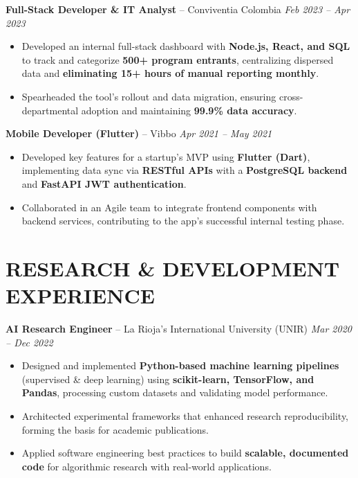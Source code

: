 \documentclass[11pt, a4paper]{article}
\begin{document}
\textbf{Full-Stack Developer \& IT Analyst} – Conviventia Colombia \hfill \textit{Feb 2023 – Apr 2023}
\begin{itemize}[leftmargin=*, nosep, topsep=4pt]
	\item Developed an internal full-stack dashboard with \textbf{Node.js, React, and SQL} to track and categorize \textbf{500+ program entrants}, centralizing dispersed data and \textbf{eliminating 15+ hours of manual reporting monthly}.
	\item Spearheaded the tool's rollout and data migration, ensuring cross-departmental adoption and maintaining \textbf{99.9\% data accuracy}.
\end{itemize}

\textbf{Mobile Developer (Flutter)} – Vibbo \hfill \textit{Apr 2021 – May 2021}
\begin{itemize}[leftmargin=*, nosep, topsep=4pt]
	\item Developed key features for a startup's MVP using \textbf{Flutter (Dart)}, implementing data sync via \textbf{RESTful APIs} with a \textbf{PostgreSQL backend} and \textbf{FastAPI JWT authentication}.
	\item Collaborated in an Agile team to integrate frontend components with backend services, contributing to the app's successful internal testing phase.
\end{itemize}

\section*{RESEARCH \& DEVELOPMENT EXPERIENCE}
\textbf{AI Research Engineer} – La Rioja’s International University (UNIR) \hfill \textit{Mar 2020 – Dec 2022}
\begin{itemize}[leftmargin=*, nosep, topsep=4pt]
	\item Designed and implemented \textbf{Python-based machine learning pipelines} (supervised \& deep learning) using \textbf{scikit-learn, TensorFlow, and Pandas}, processing custom datasets and validating model performance.
	\item Architected experimental frameworks that enhanced research reproducibility, forming the basis for academic publications.
	\item Applied software engineering best practices to build \textbf{scalable, documented code} for algorithmic research with real-world applications.
\end{itemize}
\end{document}
